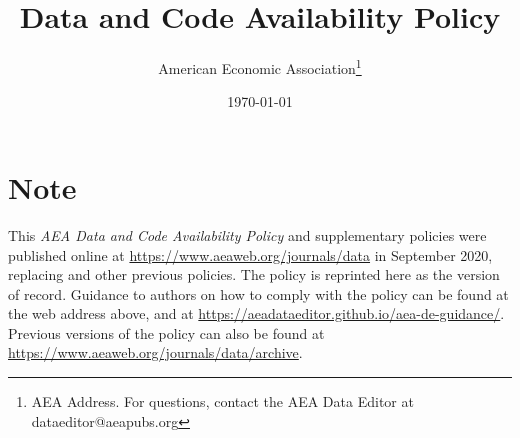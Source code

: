 \documentclass[PP]{AEA}
\begin{document}
\title{Data and Code Availability Policy}
\author{American Economic Association\thanks{AEA Address. For questions, contact the AEA Data Editor at dataeditor@aeapubs.org}}
\date{\today}
\maketitle








\appendix 
\section{Note}
This  \textit{AEA Data and Code Availability Policy} and supplementary policies were published online at \url{https://www.aeaweb.org/journals/data} in September 2020,  replacing \citet{10.1257/pandp.110.dcap} and other previous policies. The policy is reprinted here as the version of record. Guidance to authors on how to comply with the policy can be found at the web address above, and at \url{https://aeadataeditor.github.io/aea-de-guidance/}. Previous versions of the policy can also be found at \url{https://www.aeaweb.org/journals/data/archive}.





\end{document}
